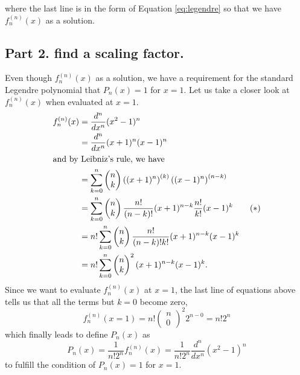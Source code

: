 \documentclass[fontsize=12pt]{article}
\begin{document}
where the last line is in the form of Equation \eqref{eq:legendre} so that we have $f_n^{(n)} (x) $ as a solution. 


\subsection*{Part 2. find a scaling factor.}

Even though $f_n^{(n)} (x)$ as a solution, we have a requirement for the standard Legendre polynomial that $P_n (x)=1$ for $x=1$. Let us take a closer look at $f_n^{(n)}(x)$ when evaluated at $x=1$.
\begin{align*}
f_n^{(n)} (x) &= \frac{d^n}{dx^n} (x^2-1)^n \\
&= \frac{d^n}{dx^n} (x+1)^n (x-1)^n \\
\intertext{and by Leibniz's rule, we have}
&= \sum_{k=0}^n \begin{pmatrix}
n \\ k
\end{pmatrix}
\left( (x+1)^n \right)^{(k)} \left( (x-1)^n \right) ^{(n-k)} \\
&= \sum_{k=0}^n \begin{pmatrix}
n \\ k
\end{pmatrix}
\frac{n!}{(n-k)!} (x+1)^{n-k} \frac{n!}{k!} (x-1)^k \qquad (*) \\
&= n! \sum_{k=0}^n \begin{pmatrix}
n \\ k
\end{pmatrix} \frac{n!}{(n-k)! k!} (x+1)^{n-k} (x-1)^k \\
&= n! \sum_{k=0}^n \begin{pmatrix}
n \\ k
\end{pmatrix}^2 (x+1)^{n-k} (x-1)^k .
\end{align*}
Since we want to evaluate $f_n^{(n)} (x)$ at $x=1$, the last line of equations above tells us that all the terms but $k=0$ become zero, 
\begin{equation*}
f_n^{(n)} (x=1) = n! \begin{pmatrix}
n \\ 0
\end{pmatrix}^2 2^{n-0} = n! 2^n
\end{equation*}
which finally leads to define $P_n (x)$ as
\begin{equation*}
P_n (x) = \frac{1}{n! 2^n}f_n^{(n)}(x)  = \frac{1}{n! 2^n} \frac{d^n}{dx^n} (x^2-1)^n
\end{equation*}
to fulfill the condition of $P_n (x) =1$ for $x=1$. 


%
%
\end{document}

